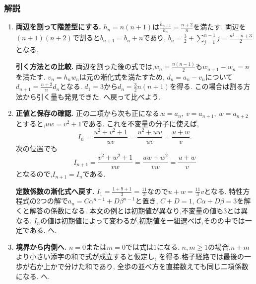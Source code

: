 \subsubsection{解説}
\begin{enumerate}[label=\textbf{問\arabic*.},format=\bookitemlink{practice-connections}{solution}{problem}]
  \item \textbf{両辺を割って階差型にする.}
    $h_n=n(n+1)$は$\frac{h_{n+1}}{h_n}=\frac{n+2}{n}$を満たす.
    両辺を$(n+1)(n+2)$で割ると$b_{n+1}=b_n+n$であり,
    $b_n=\frac32+\sum_{j=1}^{n-1}j=\frac{n^2-n+3}{2}$となる.
    \par\smallskip\textbf{引く方法との比較.}
    両辺を割った後の式では,$w_n=\frac{n(n-1)}{2}$も$w_{n+1}-w_n=n$を満たす.
    $v_n=h_nw_n$は元の漸化式を満たすため,
    $d_n=a_n-v_n$について$d_{n+1}=\frac{n+2}{n}d_n$となる.
    $d_1=3$から$d_n=\frac32n(n+1)$を得る.
    この場合は割る方法から引く量も発見できた.
    へ戻って比べよう.
  \item \textbf{正値と保存の確認.}
    正の二項から次も正になる.$u=a_n,\ v=a_{n+1},\ w=a_{n+2}$とすると,$uw=v^2+1$である.
    これを不変量の分子に使えば,
    \[
      I_n=\frac{u^2+v^2+1}{uv}
      =\frac{u^2+uw}{uv}=\frac{u+w}{v}.
    \]
    次の位置でも
    \[
      I_{n+1}=\frac{v^2+w^2+1}{vw}
      =\frac{uw+w^2}{vw}=\frac{u+w}{v}
    \]
    となるので,$I_{n+1}=I_n$である.
    \par\smallskip\textbf{定数係数の漸化式へ戻す.}
    $I_1=\frac{1+9+1}{3}=\frac{11}{3}$なので$u+w=\frac{11}{3}v$となる.
    特性方程式の2つの解で$a_n=C\alpha^{n-1}+D\beta^{n-1}$と置き,
    $C+D=1$, $C\alpha+D\beta=3$を解くと解答の係数になる.
    本文の例とは初期値が異なり,不変量の値も$3$とは異なる.
    $I_n$の値は初期値によって変わるが,初期値を一組選べば,そのの中では一定である.
    へ.
  \item \textbf{境界から内側へ.}
    $n=0$または$m=0$では式は$1$になる.
    $n,m\ge1$の場合,$n+m$より小さい添字の和で式が成立すると仮定し,
    \BookMathLayout{\[
        A_{n,m}=\binom{n+m-1}{m}+\binom{n+m-1}{m-1}
        =\binom{n+m}{m}
      \]}{\[
        \begin{aligned}
          A_{n,m}&=\binom{n+m-1}{m}+\binom{n+m-1}{m-1}\\
          &=\binom{n+m}{m}
        \end{aligned}
      \]}
    を得る.格子経路では最後の一歩が右か上かで分けた和であり,
    全歩の並べ方を直接数えても同じ二項係数になる.
    へ.

\end{enumerate}

